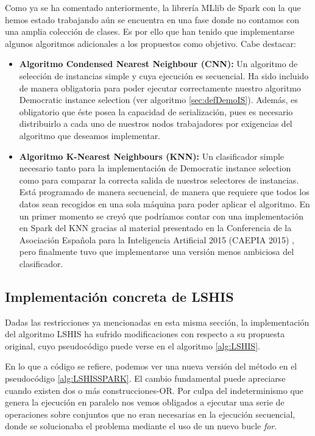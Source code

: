 Como ya se ha comentado anteriormente, la librería MLlib de Spark con la que hemos estado trabajando aún se encuentra en una fase donde no contamos con una amplia colección de clases. Es por ello que han tenido que implementarse algunos algoritmos adicionales a los propuestos como objetivo. Cabe destacar:

\begin{itemize}
\item \textbf{Algoritmo Condensed Nearest Neighbour (CNN):} Un algoritmo de selección de instancias simple y cuya ejecución es secuencial. Ha sido incluido de manera obligatoria para poder ejecutar correctamente nuestro algoritmo Democratic instance selection (ver algoritmo \ref{sec:defDemoIS}). Además, es obligatorio que éste posea la capacidad de serialización, pues es necesario distribuirlo a cada uno de nuestros nodos trabajadores por exigencias del algoritmo que deseamos implementar.
\item  \textbf{Algoritmo K-Nearest Neighbours (KNN):} Un clasificador simple necesario tanto para la implementación de Democratic instance selection como para comparar la correcta salida de nuestros selectores de instancias. Está programado de manera secuencial, de manera que requiere que todos los datos sean recogidos en una sola máquina para poder aplicar el algoritmo. En un primer momento se creyó que podríamos contar con una implementación en Spark del KNN gracias al material presentado en la Conferencia de la Asociación Española para la Inteligencia Artificial 2015 (CAEPIA 2015) \cite{KNNConferencia}, pero finalmente tuvo que implementarse una versión menos ambiciosa del clasificador.
\end{itemize}

\subsection{Implementación concreta de LSHIS}

Dadas las restricciones ya mencionadas en esta misma sección, la implementación del algoritmo LSHIS ha sufrido modificaciones con respecto a su propuesta original, cuyo pseudocódigo puede verse en el algoritmo \ref{alg:LSHIS}.

En lo que a código se refiere, podemos ver una nueva versión del método en el pseudocódigo \ref{alg:LSHISSPARK}. El cambio fundamental puede apreciarse cuando existen dos o más construcciones-OR. Por culpa del indeterminismo que genera la ejecución en paralelo nos vemos obligados a ejecutar una serie de operaciones sobre conjuntos que no eran necesarias en la ejecución secuencial, donde se solucionaba el problema mediante el uso de un nuevo bucle \textit{for}.

